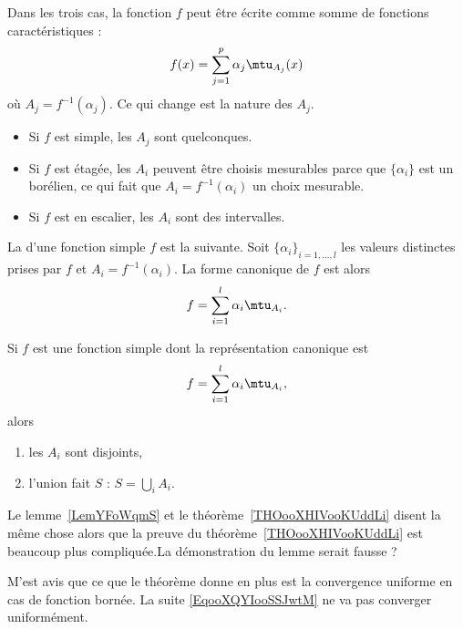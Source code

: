 Dans les trois cas, la fonction \( f\) peut être écrite comme somme de fonctions caractéristiques :
\begin{equation}
    f(x)=\sum_{j=1}^p\alpha_j\mtu_{A_j}(x)
\end{equation}
où \( A_j=f^{-1}(\alpha_j)\). Ce qui change est la nature des \( A_j\).

\begin{itemize}
    \item Si \( f\) est  simple, les \( A_j\) sont quelconques.
    \item Si \( f\) est étagée, les \( A_i\) peuvent être choisis mesurables parce que \( \{\alpha_i \}\) est un borélien, ce qui fait que \( A_i=f^{-1}(\alpha_i)\) un choix mesurable.
    \item Si \( f\) est en escalier, les \( A_i\) sont des intervalles.
\end{itemize}

\begin{definition}
    La  d'une fonction simple \( f\) est la suivante. Soit \( \{ \alpha_i \}_{i=1,\ldots, l}\) les valeurs distinctes prises par \( f\) et \( A_i=f^{-1}(\alpha_i)\). La forme canonique de \( f\) est alors
    \begin{equation}
        f=\sum_{i=1}^l\alpha_i\mtu_{A_i}.
    \end{equation}
\end{definition}

\begin{lemma}   \label{LEMooNWLTooCDuRQI}
    Si \( f\) est une fonction simple dont la représentation canonique est
    \begin{equation}
        f=\sum_{i=1}^l\alpha_i\mtu_{A_i},
    \end{equation}
    alors
    \begin{enumerate}
        \item
            les \( A_i\) sont disjoints,
        \item
            l'union fait \( S\) : \( S=\bigcup_iA_i\).
    \end{enumerate}
\end{lemma}

\begin{probleme}
    Le lemme~\ref{LemYFoWqmS} et le théorème~\ref{THOooXHIVooKUddLi} disent la même chose alors que la preuve du théorème~\ref{THOooXHIVooKUddLi} est beaucoup plus compliquée.La démonstration du lemme serait fausse ?

    M'est avis que ce que le théorème donne en plus est la convergence uniforme en cas de fonction bornée. La suite \eqref{EqooXQYIooSSJwtM} ne va pas converger uniformément.
\end{probleme}

